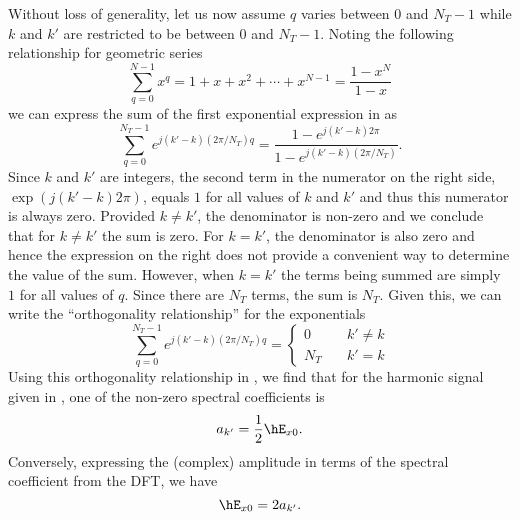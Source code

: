 Without loss of generality, let us now assume $q$ varies between $0$
and $N_T-1$ while $k$ and $k'$ are restricted to be between $0$ and
$N_T-1$.  Noting the following relationship for geometric series
\begin{equation}
\sum_{q=0}^{N-1} x^q = 1 + x + x^2 + \cdots + x^{N-1} =  \frac{1-x^N}{1-x}
\end{equation}
we can express the sum of the first exponential expression in
 as
\begin{equation}
  \sum_{q=0}^{N_T-1} e^{j(k' - k)(2\pi/N_T) q}
  =
  \frac{1 - e^{j(k' - k)2\pi}}
       {1 - e^{j(k' - k)(2\pi/N_T)}}.
  \label{eq:sumExponentsI}
\end{equation}
Since $k$ and $k'$ are integers, the second term in the numerator on
the right side, $\exp(j(k' - k)2\pi)$, equals $1$ for all values of
$k$ and $k'$ and thus this numerator is always zero.  Provided $k\neq
k'$, the denominator is non-zero and we conclude that for $k\neq k'$
the sum is zero.  For $k = k'$, the denominator is also zero and hence
the expression on the right does not provide a convenient way to
determine the value of the sum.  However, when $k=k'$ the terms being
summed are simply $1$ for all values of $q$.  Since there are $N_T$
terms, the sum is $N_T$.  Given this, we can write the ``orthogonality
relationship'' for the exponentials
\begin{equation}
  \sum_{q=0}^{N_T-1} e^{j(k' - k)(2\pi/N_T) q} 
  =
\left\{
  \begin{array}{cl}
     0    &  \quad k'\neq k \\
     N_T  &  \quad k' = k
  \end{array}
\right.
\end{equation}
Using this orthogonality relationship in
, we find that for the harmonic signal given
in , one of the non-zero spectral coefficients is
\begin{equation}
  a_{k'} = \frac{1}{2} \hE_{x0}.
\end{equation}
Conversely, expressing the (complex) amplitude in terms of the
spectral coefficient from the DFT, we have
\begin{equation}
  \hE_{x0} = 2 a_{k'}.
\end{equation}


